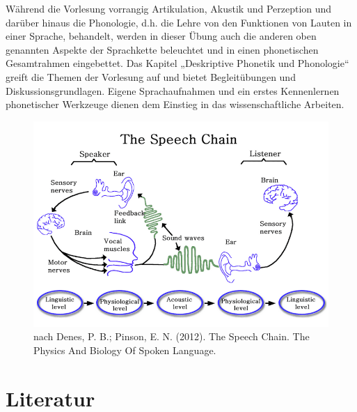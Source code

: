 \documentclass[11pt]{book}
\begin{document}
Während die Vorlesung vorrangig Artikulation, Akustik und Perzeption und darüber hinaus die Phonologie, d.\thinspace h. die Lehre von den Funktionen von Lauten in einer Sprache,  behandelt, werden in dieser Übung auch die anderen oben genannten Aspekte der Sprachkette beleuchtet und in einen phonetischen Gesamtrahmen eingebettet. Das Kapitel „Deskriptive Phonetik und Phonologie“ greift die Themen der Vorlesung auf und bietet Begleitübungen und Diskussionsgrundlagen. Eigene Sprachaufnahmen und ein erstes Kennenlernen phonetischer Werkzeuge dienen dem Einstieg in das wissenschaftliche Arbeiten.


\begin{figure}[htbp]
\begin{center}
\includegraphics[width=\textwidth]{grafiken/allgemeine-einfuehrung/speech-chain}
\caption{nach Denes, P. B.; Pinson, E. N. (2012). The Speech Chain. The Physics And Biology Of Spoken Language.}
\label{fig1}
\end{center}
\end{figure}


\section{Literatur}
\end{document}
